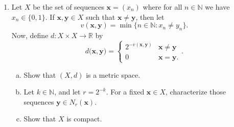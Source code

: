 \documentclass{amsart}
\newtheorem{theorem}{Theorem}
\begin{document}
\begin{enumerate}[1.]
\begin{theorem}
\begin{proof}
    \end{proof}
\end{theorem}
For part (b), consider the following sequences $(x_n)$ and $(y_n)$:
\begin{align*}
    x_n &= (-1)^n \cdot \left( 1 - \frac{2}{n} \right) \\
    y_n &= (-1)^{n + 1} \cdot \left( 1 - \frac{2}{n} \right)
\end{align*}
From Lemma 6 and Lemma 8, we know that the $\limsup_{n \to \infty} x_n$ = 1 and the  $\limsup_{n \to \infty} y_n$ = 1. Now consider the sequence
$(x_n + y_n)$:
\begin{align*}
    x_n + y_n &= (-1)^n \cdot \left( 1 - \frac{2}{n} \right) + (-1)^{n + 1} \cdot \left( 1 - \frac{2}{n} \right) \\
    &= (-1)^n \cdot \left( 1 - \frac{2}{n} + (-1) \cdot \left(1 - \frac{2}{n}\right)\right) \\
    &= (-1)^n \cdot 0 \\
    &= 0
\end{align*}
$(x_n + y_n)$ is the constant sequence $0$, which converges to $x + y = 0$, by Lemma 1. Thus, by
Rudin Example 3.18c, $\limsup_{n \to \infty} (x_n + y_n) = 0$.
We see that 
\begin{align*}
    0 &< 1 + 1 \\
    \limsup_{n \to \infty} (x_n + y_n) &<  \limsup_{n \to \infty} x_n + \limsup_{n \to \infty} y_n   
\end{align*}
\newpage
\item  Let $X$ be the set of sequences $\mathbf{x} = (x_n)$ where for all $n \in \mathbb{N}$ we have $x_n \in \{0,1\}$. If $\mathbf{x},\mathbf{y} \in X$ such that $\mathbf{x} \neq \mathbf{y}$, then let
\[ v(\mathbf{x},\mathbf{y}) = \min\{ n \in \mathbb{N}: x_n \neq y_n \}.\]
Now, define $d: X \times X \to \mathbb{R}$ by
\[ d\big( \mathbf{x},\mathbf{y} \big) = \begin{cases} 2^{-v( \mathbf{x},\mathbf{y} )} & \mathbf{x} \neq \mathbf{y} \\ 0 & \mathbf{x}=\mathbf{y}.\end{cases}.\]
\begin{enumerate}[(a)]
\item Show that $(X,d)$ is a metric space.
\item Let $k \in \mathbb{N}$, and let $r=2^{-k}$. For a fixed $\mathbf{x} \in X$, characterize those sequences $\mathbf{y} \in N_{r}(\mathbf{x})$.
\item Show that $X$ is compact.
\end{enumerate}
\end{enumerate}
\end{document}
